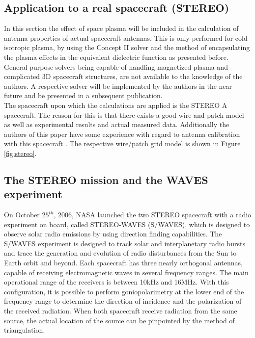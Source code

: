 \documentclass[two-column,ras]{agutex}
\begin{document}
\begin{article}
\section{Application to a real spacecraft (STEREO)}
In this section the effect of space plasma will be included in the calculation of antenna properties of actual spacecraft antennas. This is only performed for cold isotropic plasma, by using the Concept II solver and the method of encapsulating the plasma effects in the equivalent dielectric function as presented before. General purpose solvers being capable of handling magnetized plasma and complicated 3D spacecraft structures, are not available to the knowledge of the authors. A respective solver will be implemented by the authors in the near future and be presented in a subsequent publication. \\

The spacecraft upon which the calculations are applied is the STEREO A spacecraft. The reason for this is that there exists a good wire and patch model as well as experimental results and actual measured data. Additionally the authors of this paper have some experience with regard to antenna calibration with this spacecraft \cite{ossi09}. The respective wire/patch grid model is shown in Figure \ref{fig:stereo}.\\

\subsection{The STEREO mission and the WAVES experiment}
On October $25^{th}$, 2006, NASA launched the two STEREO spacecraft with a radio experiment on board, called STEREO-WAVES (S/WAVES), which is designed to observe solar radio emissions by using direction finding capabilities. The S/WAVES experiment is designed to track solar and interplanetary radio bursts and trace the generation and evolution of radio disturbances from the Sun to Earth orbit and beyond. Each spacecraft has three nearly orthogonal antennas, capable of receiving electromagnetic waves in several frequency ranges. The main operational range of the receivers is between 10kHz and 16MHz. With this configuration, it is possible to perform goniopolarimetry at the lower end of the frequency range to determine the direction of incidence and the polarization of the received radiation. When both spacecraft receive radiation from the same source, the actual location of the source can be pinpointed by the method of triangulation.\\


\end{article}
\end{document}
